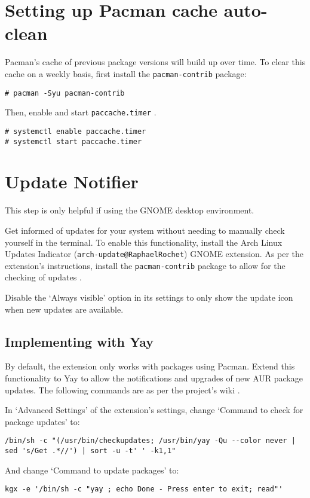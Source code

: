 \documentclass[a4paper]{article}
\begin{document}
\section{Setting up Pacman cache auto-clean}

Pacman's cache of previous package versions will build up over time.
To clear this cache on a weekly basis, first install the \lstinline|pacman-contrib| package:
\begin{lstlisting}
# pacman -Syu pacman-contrib
\end{lstlisting}

Then, enable and start \lstinline|paccache.timer| \cite{paccache-timer}.

\begin{lstlisting}
# systemctl enable paccache.timer
# systemctl start paccache.timer
\end{lstlisting}


\section{Update Notifier}

This step is only helpful if using the GNOME desktop environment.

Get informed of updates for your system without needing to manually check yourself in the terminal.
To enable this functionality, install the Arch Linux Updates Indicator (\lstinline|arch-update@RaphaelRochet|) GNOME extension.
As per the extension's instructions, install the \lstinline|pacman-contrib| package to allow for the checking of updates \cite{arch-update-wiki}.

Disable the `Always visible' option in its settings to only show the update icon when new updates are available.

\subsection{Implementing with Yay}

By default, the extension only works with packages using Pacman.
Extend this functionality to Yay to allow the notifications and upgrades of new AUR package updates.
The following commands are as per the project's wiki \cite{arch-update-wiki}.

In `Advanced Settings' of the extension's settings, change `Command to check for package updates' to:
\begin{lstlisting}
/bin/sh -c "(/usr/bin/checkupdates; /usr/bin/yay -Qu --color never | sed 's/Get .*//') | sort -u -t' ' -k1,1"
\end{lstlisting}
And change `Command to update packages' to:
\begin{lstlisting}
kgx -e '/bin/sh -c "yay ; echo Done - Press enter to exit; read"'
\end{lstlisting}
\end{document}
